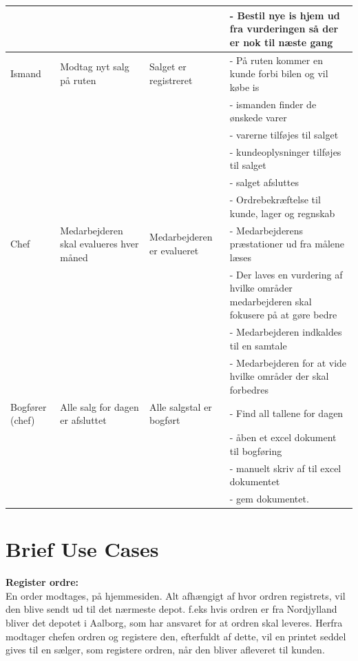\begin{center}
\begin{longtable}{ |p{90pt}|p{90pt}|p{90pt}|p{90pt}| }
    &&&
    - Bestil nye is hjem ud fra vurderingen så der er nok til næste gang \\
    \hline
    Ismand & Modtag nyt salg på ruten & Salget er registreret & 
    - På ruten kommer en kunde forbi bilen og vil købe is \\
    &&&
    - ismanden finder de ønskede varer \\
    &&&
    - varerne tilføjes til salget \\
    &&&
    - kundeoplysninger tilføjes til salget \\
    &&&
    - salget afsluttes \\
    &&&
    - Ordrebekræftelse til kunde, lager og regnskab \\
    \hline
    Chef & Medarbejderen skal evalueres hver måned & Medarbejderen er evalueret &
    - Medarbejderens præstationer ud fra målene læses \\
    &&&
    - Der laves en vurdering af hvilke områder medarbejderen skal fokusere på at gøre bedre \\
    &&&
    - Medarbejderen indkaldes til en samtale \\
    &&&
    - Medarbejderen for at vide hvilke områder der skal forbedres \\
    \hline
    Bogfører (chef) & Alle salg for dagen er afsluttet & Alle salgstal er bogført & 
    - Find all tallene for dagen \\
    &&&
    - åben et excel dokument til bogføring \\
    &&&
    - manuelt skriv af til excel dokumentet \\
    &&&
    - gem dokumentet. \\
    \hline
\end{longtable}
\end{center}

\section{Brief Use Cases}\label{brief}
\textbf{Register ordre:} \\
En order modtages, på hjemmesiden. Alt afhængigt af hvor ordren registrets, vil den blive sendt ud til det nærmeste depot. f.eks hvis ordren er fra Nordjylland bliver det depotet i Aalborg, som har ansvaret for at ordren skal leveres. Herfra modtager chefen ordren og registere den, efterfuldt af dette, vil en printet seddel gives til en sælger, som registere ordren, når den bliver afleveret til kunden. 

